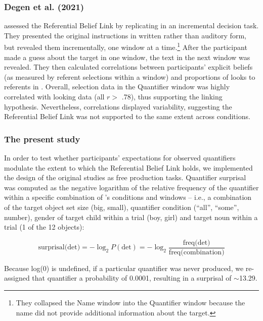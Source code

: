 \documentclass[10pt,letterpaper]{article}
\begin{document}
\subsubsection{Degen et al. (2021)} assessed the Referential Belief Link by replicating   in an incremental decision task. They presented the original instructions in written rather than auditory form, but revealed them incrementally, one window at a time.\footnote{They collapsed the Name window into the Quantifier window because the name did not provide additional information about the target.} After the participant  made a guess about the target in one window, the text in the next window was revealed. They then calculated correlations between participants’ explicit beliefs (as measured by referent selections within a window) and proportions of looks to referents in . Overall, selection data in the Quantifier window was highly correlated with looking data (all $r >$ .78), thus supporting the linking hypothesis. Nevertheless, correlations displayed variability, suggesting the Referential Belief Link was not supported to the same extent across conditions.

\subsubsection{The present study}
In order to test whether participants’ expectations for observed quantifiers modulate the extent to which the Referential Belief Link holds, we implemented the design of the original studies as free production tasks. Quantifier surprisal was computed as the negative logarithm of the relative frequency of the quantifier  within a specific combination of ’s conditions and windows -- i.e., a combination of the target object set size (big, small), quantifier condition (“all”, “some”, number),  gender of target child within a trial (boy, girl) and target noun within a trial (1 of the 12 objects): 

\smallskip
\begin{equation*}
\label{surprisal}
\textrm{surprisal(det)} = - \log_2 P(\textrm{det}) = - \log_2 \frac{\textrm{freq(det)}}{\textrm{freq(combination)}}
\end{equation*}

\smallskip

Because log(0) is undefined, if a particular quantifier was never produced, we re-assigned that quantifier a probability of 0.0001, resulting in a surprisal of $\sim$13.29.
\end{document}
